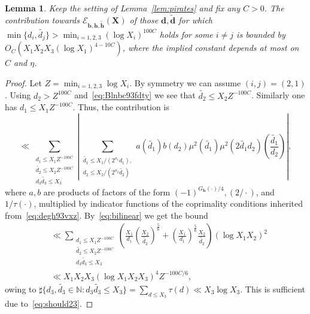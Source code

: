 \documentclass[a4paper,12pt,reqno]{amsart}
\numberwithin{equation}{section} \numberwithin{figure}{section}
\newcommand\N{\mathbb{N}}
\renewcommand{\l}{\left}
\renewcommand{\r}{\right}
\renewcommand{\b}{\mathbf}
\renewcommand{\leq}{\leqslant}
\renewcommand{\#}{\sharp}
\newtheorem{lemma}{Lemma}
\theoremstyle{definition}
\numberwithin{lemma}{section}
\begin{document}
\begin{lemma}\label{lem:passacaglia_koopman2} Keep the setting of Lemma~\ref{lem:pirates} and  fix any $C> 0 $.
The contribution towards 
$\mathcal{E}_{\b b, \mathbf{h}, \widetilde{\mathbf{h}}}(\b X)$ of those $\b d,\widetilde{\b d}$ for which  
$ \min\{d_i, \widetilde{d_j} \}>\min_{i=1,2,3} (\log  X_i)^{100 C}$ holds  for  some    $i\neq j$   
is  bounded by  $O_C  ( X_1X_2X_3 (\log X_1)^{4-10C} ) $,
where the implied constant depends at most on $C$ and $\eta$.
\end{lemma}



\begin{proof}Let $Z=\min_{i=1,2,3} \log X_i$.
By symmetry we can assume $(i,j)=(2,1)$. Using 
$d_2>Z^{100 C}  $ and~\eqref {eq:Blnbc93fdty}
we see that 
$   \widetilde{d_2}   \leq X_2 Z^{-100 C} $. Similarly   one has 
$   d_1 \leq X_1 Z^{-100 C} $. Thus, the contribution is \[ 
 \ll    \sum_{\substack{     d_1   \leq X_1 Z^{-100 C}    \\ \widetilde{d_2}   \leq X_2 Z^{-100 C} \\  d_3    \widetilde{d_3} \leq X_3  }}  
   \left \vert  \sum_{\substack{      \widetilde{d_1}     \leq     X_1/(2^{\sigma_1  } d_1   ),   \\  
  d_2     \leq     X_2/( 2^{\sigma_2  }\widetilde{d_2}   ) }} 
 a(   \widetilde{d_1}  )  b(d_2)
\mu^2(  \widetilde{d_1}    )    \mu^2(2 \widetilde{d_1}   d_2     )
 \l(\frac{               \widetilde{d_1}     }{d_2     }\r) 
\r \vert 
, \] 
where $a, b $ are     products  of factors 
of the form  
  $(-1)^{G_{\b h }(\cdot ) /4 } , (2/\cdot )$, and $1/ \tau(\cdot ) $,
multiplied by  indicator functions  of the coprimality conditions inherited from~\eqref{eq:degh93vxz}.
By~\eqref{eq:bilinear} we get the bound 
\begin{align*} & \ll    \sum_{\substack{     d_1   \leq X_1 Z^{-100 C}    \\ \widetilde{d_2}   \leq X_2 Z^{-100 C} \\  d_3    \widetilde{d_3} \leq X_3  }}  
\l(  \frac{ X_1}{ d_1}      \l(  \frac{ X  _2   }{    \widetilde{d_2}  }      \r)^{\frac{5}{6} }  +\l( \frac{ X _1}{ d_1 }         \r)^{\frac{5}{6} }  \frac{ X_2}
{  \widetilde{d_2} }      \r) (\log  X_1X_2)^2\\&\ll X_1X_2X_3 (\log  X_1X_2X_3)^4 Z^{-100C/6}  ,\end{align*}
owing to  $\#\{d_3  ,  \widetilde{d_3}  \in \N:   d_3    \widetilde{d_3} \leq X_3 \} = \sum_{d \leq X_3} \tau(d) \ll  X_3 \log  X_3 $. 
This is sufficient due to~\eqref{eq:should23}.
\end{proof}
\end{document}
